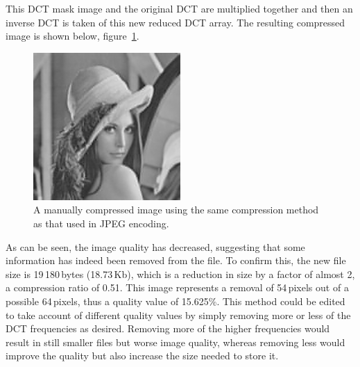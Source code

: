 		This DCT mask image and the original DCT are multiplied together and then an inverse DCT is taken of this new reduced DCT array. The resulting compressed image is shown below, figure~\ref{fig:mancompresslena}.
		\begin{figure}[ht]
			\centering
			\includegraphics[width=0.5\textwidth]{lena_manual_compression.jpg}
			\caption{A manually compressed image using the same compression method as that used in JPEG encoding.\label{fig:mancompresslena}}
		\end{figure}

		As can be seen, the image quality has decreased, suggesting that some information has indeed been removed from the file. To confirm this, the new file size is 19\,180\,bytes (18.73\,Kb), which is a reduction in size by a factor of almost 2, a compression ratio of 0.51. This image represents a removal of 54\,pixels out of a possible 64\,pixels, thus a quality value of 15.625\%. This method could be edited to take account of different quality values by simply removing more or less of the DCT frequencies as desired. Removing more of the higher frequencies would result in still smaller files but worse image quality, whereas removing less would improve the quality but also increase the size needed to store it.

